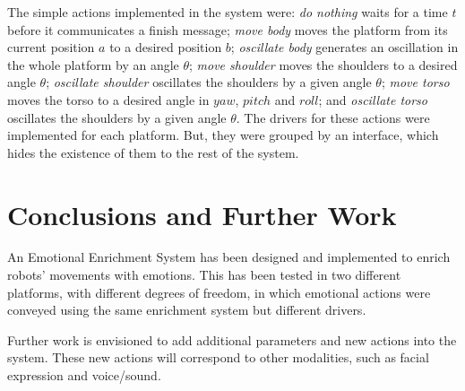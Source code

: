 \documentclass{sig-alternate-05-2015}
\begin{document}
The simple actions implemented in the system were: \textit{do nothing} waits for a time $t$ before it communicates a finish message; \textit{move body} moves the platform from its current position $a$ to a desired position $b$; \textit{oscillate body} generates an oscillation in the whole platform by an angle $\theta$; \textit{move shoulder} moves the shoulders to a desired angle $\theta$; \textit{oscillate shoulder} oscillates the shoulders by a given angle $\theta$; \textit{move torso} moves the torso to a desired angle in $yaw$, $pitch$ and $roll$; and \textit{oscillate torso} oscillates the shoulders by a given angle $\theta$. The drivers for these actions were implemented for each platform. But, they were grouped by an interface, which hides the existence of them to the rest of the system.

\section{Conclusions and Further Work}

An Emotional Enrichment System has been designed and implemented to enrich robots' movements with emotions. 
This has been tested in two different platforms, with different degrees of freedom, in which emotional actions were conveyed using the same enrichment system but different drivers. 

Further work is envisioned to add additional parameters and new actions into the system. These new actions will correspond to other modalities, such as facial expression and voice/sound.


\end{document}
